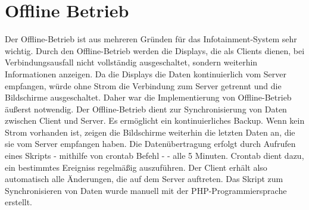 \section{Offline Betrieb}
Der Offline-Betrieb ist aus mehreren Gründen für das Infotainment-System sehr wichtig. Durch den Offline-Betrieb werden die Displays, die als Clients dienen, bei Verbindungsausfall nicht vollständig ausgeschaltet, sondern weiterhin Informationen anzeigen. Da die Displays die Daten kontinuierlich vom Server empfangen, würde ohne Strom die Verbindung zum Server getrennt und die Bildschirme ausgeschaltet. Daher war die Implementierung von Offline-Betrieb äußerst notwendig. Der Offline-Betrieb dient zur Synchronisierung von Daten zwischen Client und Server. Es ermöglicht ein kontinuierliches Backup. Wenn kein Strom vorhanden ist, zeigen die Bildschirme weiterhin die letzten Daten an, die sie vom Server empfangen haben. Die Datenübertragung erfolgt durch Aufrufen eines Skripts - mithilfe von crontab Befehl  - - alle 5 Minuten. Crontab dient dazu, ein bestimmtes Ereigniss regelm\"a\ss{}ig auszuf\"uhren. Der Client erhält also automatisch alle Änderungen, die auf dem Server auftreten. Das Skript zum Synchronisieren von Daten wurde manuell mit der PHP-Programmiersprache erstellt.
